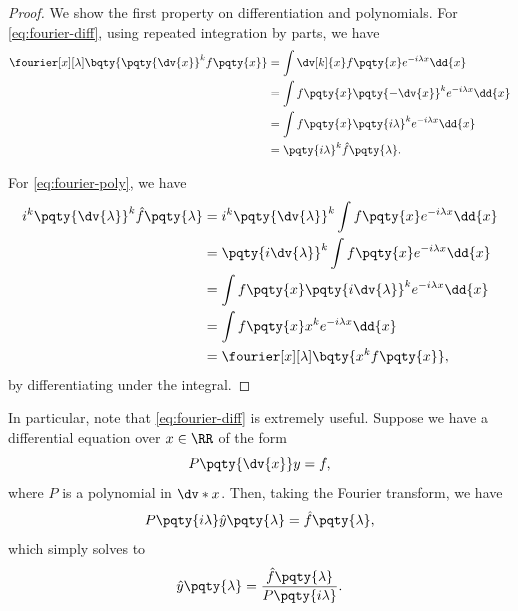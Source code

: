\begin{proof}
    We show the first property on differentiation and polynomials. For \eqref{eq:fourier-diff}, using repeated integration by parts, we have
    \begin{subequations}
        \begin{align}
            \fourier[x][\lambda] \bqty{\pqty{\dv{x}}^k f\pqty{x}} &= \int \dv[k]{x} f\pqty{x} e^{-i \lambda x} \dd{x} \\
            &= \int f\pqty{x} \pqty{- \dv{x}}^k e^{-i \lambda x} \dd{x} \\
            &= \int f\pqty{x} \pqty{i \lambda}^k e^{-i \lambda x} \dd{x} \\
            &= \pqty{i \lambda}^k \hat{f}\pqty{\lambda}.
        \end{align}
    \end{subequations}

    For \eqref{eq:fourier-poly}, we have
    \begin{subequations}
        \begin{align}
            i^k \pqty{\dv{\lambda}}^k \hat{f}\pqty{\lambda} &= i^k \pqty{\dv{\lambda}}^k \int f\pqty{x} e^{-i \lambda x} \dd{x} \\
            &= \pqty{i \dv{\lambda}}^k \int f\pqty{x} e^{-i \lambda x} \dd{x} \\
            &= \int f\pqty{x} \pqty{i \dv{\lambda}}^k e^{-i \lambda x} \dd{x} \\
            &= \int f\pqty{x} x^k e^{-i \lambda x} \dd{x} \\
            &= \fourier[x][\lambda] \bqty{x^k f\pqty{x}},
        \end{align}
    \end{subequations}
    by differentiating under the integral.
\end{proof}

In particular, note that \eqref{eq:fourier-diff} is extremely useful. Suppose we have a differential equation over \(x \in \RR\) of the form
\begin{equation}
    P\pqty{\dv{x}} y = f,
\end{equation}
where \(P\) is a polynomial in \(\dv*{x}\). Then, taking the Fourier transform, we have
\begin{equation}
    P\pqty{i \lambda} \hat{y}\pqty{\lambda} = \hat{f}\pqty{\lambda},
\end{equation}
which simply solves to
\begin{equation}
    \hat{y} \pqty{\lambda} = \frac{\hat{f}\pqty{\lambda}}{P\pqty{i \lambda}}.
\end{equation}

